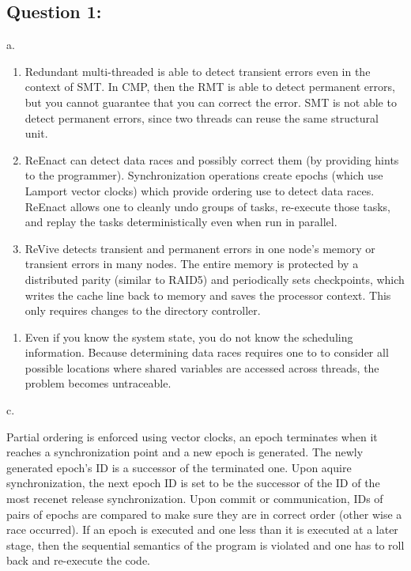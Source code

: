 \subsection{Question 1:}\label{question-1}

a.

\begin{enumerate}
\def\labelenumi{\arabic{enumi}.}
\item
  Redundant multi-threaded is able to detect transient errors even in
  the context of SMT. In CMP, then the RMT is able to detect permanent
  errors, but you cannot guarantee that you can correct the error. SMT
  is not able to detect permanent errors, since two threads can reuse
  the same structural unit.
\item
  ReEnact can detect data races and possibly correct them (by providing
  hints to the programmer). Synchronization operations create epochs
  (which use Lamport vector clocks) which provide ordering use to detect
  data races. ReEnact allows one to cleanly undo groups of tasks,
  re-execute those tasks, and replay the tasks deterministically even
  when run in parallel.
\item
  ReVive detects transient and permanent errors in one node's memory or
  transient errors in many nodes. The entire memory is protected by a
  distributed parity (similar to RAID5) and periodically sets
  checkpoints, which writes the cache line back to memory and saves the
  processor context. This only requires changes to the directory
  controller.
\end{enumerate}

\begin{enumerate}
\def\labelenumi{\alph{enumi}.}
\setcounter{enumi}{1}
\itemsep1pt\parskip0pt
\item
  Even if you know the system state, you do not know the scheduling
  information. Because determining data races requires one to to
  consider all possible locations where shared variables are accessed
  across threads, the problem becomes untraceable.
\end{enumerate}

c.

Partial ordering is enforced using vector clocks, an epoch terminates
when it reaches a synchronization point and a new epoch is generated.
The newly generated epoch's ID is a successor of the terminated one.
Upon aquire synchronization, the next epoch ID is set to be the
successor of the ID of the most recenet release synchronization. Upon
commit or communication, IDs of pairs of epochs are compared to make
sure they are in correct order (other wise a race occurred). If an epoch
is executed and one less than it is executed at a later stage, then the
sequential semantics of the program is violated and one has to roll back
and re-execute the code.

